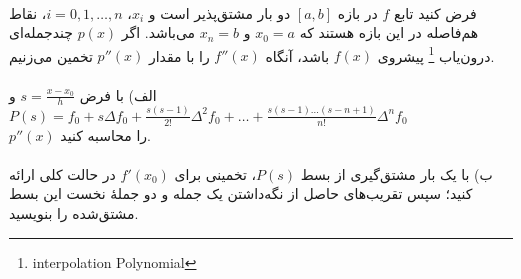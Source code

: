 \\
فرض کنید تابع \( f \) در بازه \([a, b]\) دو بار مشتق‌پذیر است و \( x_i \)، \( i = 0, 1, \ldots , n\)، نقاط هم‌فاصله در این بازه هستند که \( x_0 = a\) و \( x_n = b\) می‌باشد. اگر \( p(x) \) چندجمله‌ای درون‌یاب
\footnote{interpolation Polynomial}
پیشروی \( f(x) \) باشد، آنگاه \( f''(x) \) را با مقدار \( p''(x) \) تخمین می‌زنیم.
\\
\\
الف) با فرض
\( s = \frac{{x - x_0}}{{h}} \)
و
\( P(s) = f_0 + s\Delta f_0 + \frac{{s(s - 1)}}{{2!}}\Delta^2 f_0 + \ldots + \frac{{s(s-1)\ldots(s-n+1)}}{{n!}}\Delta^n f_0 \)
\\
\(p''(x)\)
را محاسبه کنید.
\\
\\
ب) با یک بار مشتق‌گیری از بسط \(P(s)\)، تخمینی برای \( f'(x_0) \) در حالت کلی ارائه کنید؛ سپس تقریب‌های حاصل از نگه‌داشتن یک جمله و دو جملهٔ نخست این بسط مشتق‌شده را بنویسید.
